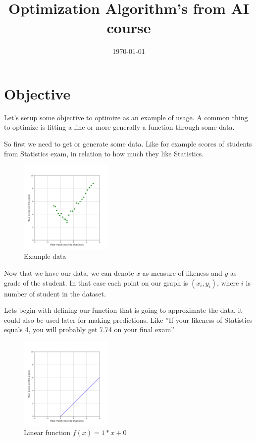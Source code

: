 \documentclass{article}
\title{Optimization Algorithm's from AI course}
\date{\today}
\begin{document}
\maketitle

\section{Objective}
Let's setup some objective to optimize as an example of usage. A common thing to optimize is fitting a line or more generally a function through some data.\newline

So first we need to get or generate some data. Like for example scores of students from Statistics exam, in relation to how much they like Statistics.
\begin{figure}[h]
    \centering
    \includegraphics[width=0.4\textwidth]{../images/myplot1.png}
    \caption{Example data}
    \label{fig:data}
\end{figure}

Now that we have our data, we can denote $x$ as measure of likeness and $y$ as grade of the student. In that case each point on our graph is $(x_i, y_i)$, where $i$ is number of student in the dataset.

\break

Lets begin with defining our function that is going to approximate the data, it could also be used later for making predictions. Like ''If your likeness of Statistics equals 4, you will probably get 7.74 on your final exam''

\begin{figure}[h]
    \centering
    \includegraphics[width=0.4\textwidth]{../images/myplot2.png}
    \caption{Linear function $f(x) = 1 * x + 0$}
    \label{fig:data_line}
\end{figure}
\end{document}

